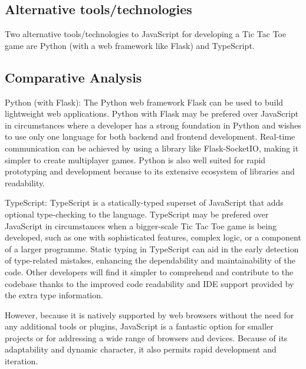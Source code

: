\documentclass[a4paper, 11pt]{report}
\begin{document}
\subsection{Alternative tools/technologies}

Two alternative tools/technologies to JavaScript for developing a Tic Tac Toe game are Python (with a web framework like Flask) and TypeScript.

\subsection{Comparative Analysis}

Python (with Flask): The Python web framework Flask can be used to build lightweight web applications. Python with Flask may be prefered over JavaScript in circumstances where a developer has a strong foundation in Python and wishes to use only one language for both backend and frontend development. Real-time communication can be achieved by using a library like Flask-SocketIO, making it simpler to create multiplayer games. Python is also well suited for rapid prototyping and development because to its extensive ecosystem of libraries and readability.

TypeScript: TypeScript is a statically-typed superset of JavaScript that adds optional type-checking to the language.  TypeScript may be prefered over JavaScript in circumstances when a bigger-scale Tic Tac Toe game is being developed, such as one with sophisticated features, complex logic, or a component of a larger programme. Static typing in TypeScript can aid in the early detection of type-related mistakes, enhancing the dependability and maintainability of the code. Other developers will find it simpler to comprehend and contribute to the codebase thanks to the improved code readability and IDE support provided by the extra type information.

However, because it is natively supported by web browsers without the need for any additional tools or plugins, JavaScript is a fantastic option for smaller projects or for addressing a wide range of browsers and devices. Because of its adaptability and dynamic character, it also permits rapid development and iteration.

\newpage



\end{document}
